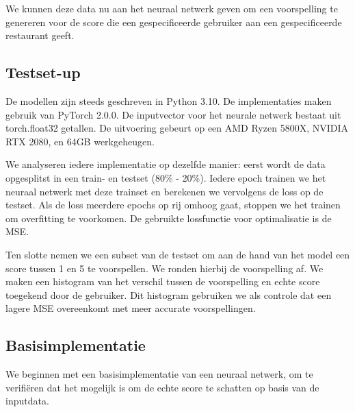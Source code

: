 We kunnen deze data nu aan het neuraal netwerk geven om een voorspelling te genereren voor de score die een gespecificeerde gebruiker aan een gespecificeerde restaurant geeft.




\subsection{Testset-up}
De modellen zijn steeds geschreven in Python 3.10. De implementaties maken gebruik van PyTorch 2.0.0. \cite{pytorch} De inputvector voor het neurale netwerk bestaat uit \verb||torch.float32 getallen. De uitvoering gebeurt op een AMD Ryzen 5800X, NVIDIA RTX 2080, en 64GB werkgeheugen. %

We analyseren iedere implementatie op dezelfde manier: eerst wordt de data opgesplitst in een train- en testset (80\% - 20\%). %
Iedere epoch trainen we het neuraal netwerk met deze trainset en berekenen we vervolgens de loss op de testset. Als de loss meerdere epochs op rij omhoog gaat, stoppen we het trainen om overfitting te voorkomen. De gebruikte lossfunctie voor optimalisatie is de MSE.

Ten slotte nemen we een subset van de testset om aan de hand van het model een score tussen 1 en 5 te voorspellen. We ronden hierbij de voorspelling af. We maken een histogram van het verschil tussen de voorspelling en echte score toegekend door de gebruiker. Dit histogram gebruiken we als controle dat een lagere MSE overeenkomt met meer accurate voorspellingen.

\subsection{Basisimplementatie}
We beginnen met een basisimplementatie van een neuraal netwerk, om te verifiëren dat het mogelijk is om de echte score te schatten op basis van de inputdata.





